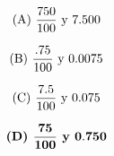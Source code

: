 \documentclass[11pt]{article}
\begin{document}
\begin{multicols}{2}

\begin{equation} \text{(A) \vspace{4mm}} \frac{750}{100} \text{\vspace{20cm} y
\vspace{20cm}} 7.500 \nonumber \end{equation}

\begin{equation} \text{(B) \vspace{4mm}} \frac{.75}{100} \text{\vspace{20cm} y
\vspace{20cm}} 0.0075  \nonumber \end{equation}

\begin{equation} \text{(C) \vspace{4mm}} \frac{7.5}{100} \text{\vspace{20cm} y
\vspace{20cm}} 0.075 \nonumber \end{equation}

\begin{equation} \mathbf{\textbf{(D) \vspace{4mm}} \frac{75}{100} \textbf{\vspace{20cm} y
\vspace{20cm}} 0.750} \nonumber \end{equation}

\end{multicols}

\vspace{5mm}
\end{document}
